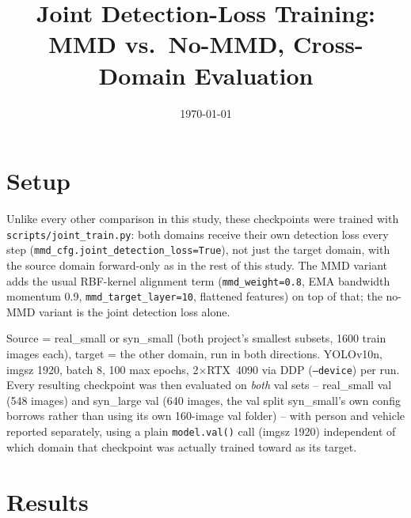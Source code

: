 \documentclass[11pt]{article}
\title{Joint Detection-Loss Training: MMD vs.\ No-MMD, Cross-Domain Evaluation}
\author{}
\date{\today}
\begin{document}
\maketitle

\section{Setup}

Unlike every other comparison in this study, these checkpoints were trained with
\texttt{scripts/joint\_train.py}: both domains receive their own detection loss every
step (\texttt{mmd\_cfg.joint\_detection\_loss=True}), not just the target domain, with
the source domain forward-only as in the rest of this study. The MMD variant adds the
usual RBF-kernel alignment term (\texttt{mmd\_weight=0.8}, EMA bandwidth momentum 0.9,
\texttt{mmd\_target\_layer=10}, flattened features) on top of that; the no-MMD variant
is the joint detection loss alone.

Source = real\_small or syn\_small (both project's smallest subsets, 1600 train images
each), target = the other domain, run in both directions. YOLOv10n, imgsz 1920, batch 8,
100 max epochs, 2$\times$RTX~4090 via DDP (\texttt{--device}) per run. Every resulting
checkpoint was then evaluated on \emph{both} val sets -- real\_small val (548 images)
and syn\_large val (640 images, the val split syn\_small's own config borrows rather
than using its own 160-image val folder) -- with person and vehicle
reported separately, using a plain \texttt{model.val()} call (imgsz 1920) independent of
which domain that checkpoint was actually trained toward as its target.

\section{Results}
\end{document}
